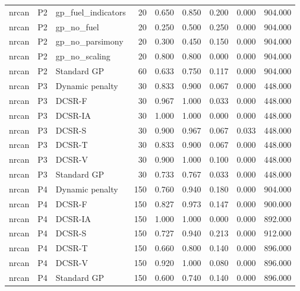 \begin{tabular}{lllrrrrrr}
nrcan & P2 & gp\_fuel\_indicators & 20 & 0.650 & 0.850 & 0.200 & 0.000 & 904.000 \\
nrcan & P2 & gp\_no\_fuel & 20 & 0.250 & 0.500 & 0.250 & 0.000 & 904.000 \\
nrcan & P2 & gp\_no\_parsimony & 20 & 0.300 & 0.450 & 0.150 & 0.000 & 904.000 \\
nrcan & P2 & gp\_no\_scaling & 20 & 0.800 & 0.800 & 0.000 & 0.000 & 904.000 \\
nrcan & P2 & Standard GP & 60 & 0.633 & 0.750 & 0.117 & 0.000 & 904.000 \\
nrcan & P3 & Dynamic penalty & 30 & 0.833 & 0.900 & 0.067 & 0.000 & 448.000 \\
nrcan & P3 & DCSR-F & 30 & 0.967 & 1.000 & 0.033 & 0.000 & 448.000 \\
nrcan & P3 & DCSR-IA & 30 & 1.000 & 1.000 & 0.000 & 0.000 & 448.000 \\
nrcan & P3 & DCSR-S & 30 & 0.900 & 0.967 & 0.067 & 0.033 & 448.000 \\
nrcan & P3 & DCSR-T & 30 & 0.833 & 0.900 & 0.067 & 0.000 & 448.000 \\
nrcan & P3 & DCSR-V & 30 & 0.900 & 1.000 & 0.100 & 0.000 & 448.000 \\
nrcan & P3 & Standard GP & 30 & 0.733 & 0.767 & 0.033 & 0.000 & 448.000 \\
nrcan & P4 & Dynamic penalty & 150 & 0.760 & 0.940 & 0.180 & 0.000 & 904.000 \\
nrcan & P4 & DCSR-F & 150 & 0.827 & 0.973 & 0.147 & 0.000 & 900.000 \\
nrcan & P4 & DCSR-IA & 150 & 1.000 & 1.000 & 0.000 & 0.000 & 892.000 \\
nrcan & P4 & DCSR-S & 150 & 0.727 & 0.940 & 0.213 & 0.000 & 912.000 \\
nrcan & P4 & DCSR-T & 150 & 0.660 & 0.800 & 0.140 & 0.000 & 896.000 \\
nrcan & P4 & DCSR-V & 150 & 0.920 & 1.000 & 0.080 & 0.000 & 896.000 \\
nrcan & P4 & Standard GP & 150 & 0.600 & 0.740 & 0.140 & 0.000 & 896.000 \\
\bottomrule
\end{tabular}
